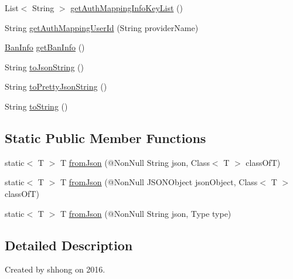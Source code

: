 \begin{DoxyCompactItemize}
\item 
List$<$ String $>$ \hyperlink{classcom_1_1toast_1_1android_1_1gamebase_1_1auth_1_1data_1_1_auth_token_abf4f630629a54493de338073ce33e60a}{get\+Auth\+Mapping\+Info\+Key\+List} ()
\item 
String \hyperlink{classcom_1_1toast_1_1android_1_1gamebase_1_1auth_1_1data_1_1_auth_token_a0a12ee1665355cc28dca331e56250774}{get\+Auth\+Mapping\+User\+Id} (String provider\+Name)
\item 
\hyperlink{classcom_1_1toast_1_1android_1_1gamebase_1_1auth_1_1data_1_1_ban_info}{Ban\+Info} \hyperlink{classcom_1_1toast_1_1android_1_1gamebase_1_1auth_1_1data_1_1_auth_token_a2af170ff05b78dcaf81df7fb2c9c2764}{get\+Ban\+Info} ()
\item 
String \hyperlink{classcom_1_1toast_1_1android_1_1gamebase_1_1base_1_1_value_object_a58acf6402880e9769d79d8667581fa6a}{to\+Json\+String} ()
\item 
String \hyperlink{classcom_1_1toast_1_1android_1_1gamebase_1_1base_1_1_value_object_a054431f3d988a22295cfc8b784ff2637}{to\+Pretty\+Json\+String} ()
\item 
String \hyperlink{classcom_1_1toast_1_1android_1_1gamebase_1_1base_1_1_value_object_ad146fa8579a5f8a876c4688cc5a68520}{to\+String} ()
\end{DoxyCompactItemize}
\subsection*{Static Public Member Functions}
\begin{DoxyCompactItemize}
\item 
static$<$ T $>$ T \hyperlink{classcom_1_1toast_1_1android_1_1gamebase_1_1base_1_1_value_object_ae6655c88c20a9a8406dc11b46250ac7b}{from\+Json} (@Non\+Null String json, Class$<$ T $>$ class\+OfT)
\item 
static$<$ T $>$ T \hyperlink{classcom_1_1toast_1_1android_1_1gamebase_1_1base_1_1_value_object_ab83c4196ee2e3f11553bbe0f04dc2101}{from\+Json} (@Non\+Null J\+S\+O\+N\+Object json\+Object, Class$<$ T $>$ class\+OfT)
\item 
static$<$ T $>$ T \hyperlink{classcom_1_1toast_1_1android_1_1gamebase_1_1base_1_1_value_object_aa901d97d495150b54bcb80c05672f58a}{from\+Json} (@Non\+Null String json, Type type)
\end{DoxyCompactItemize}


\subsection{Detailed Description}
Created by shhong on 2016. 


